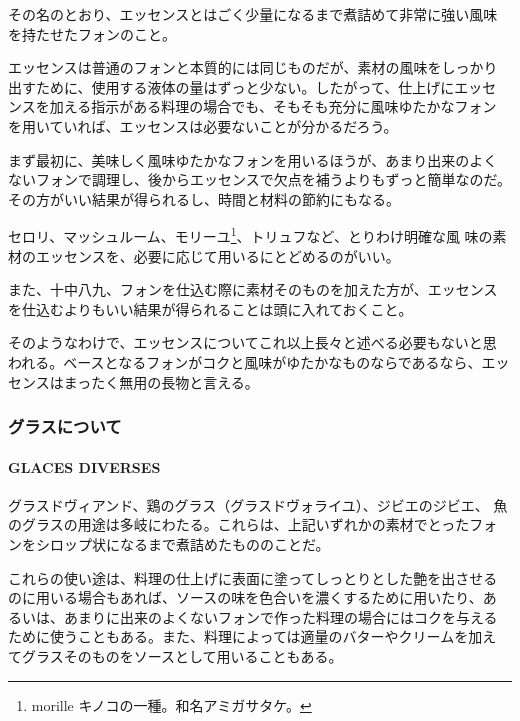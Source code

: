 \begin{recette}
その名のとおり、エッセンスとはごく少量になるまで煮詰めて非常に強い風味
を持たせたフォンのこと。

エッセンスは普通のフォンと本質的には同じものだが、素材の風味をしっかり
出すために、使用する液体の量はずっと少ない。したがって、仕上げにエッセ
ンスを加える指示がある料理の場合でも、そもそも充分に風味ゆたかなフォン
を用いていれば、エッセンスは必要ないことが分かるだろう。

まず最初に、美味しく風味ゆたかなフォンを用いるほうが、あまり出来のよく
ないフォンで調理し、後からエッセンスで欠点を補うよりもずっと簡単なのだ。
その方がいい結果が得られるし、時間と材料の節約にもなる。

セロリ、マッシュルーム、モリーユ\footnote{morille
  キノコの一種。和名アミガサタケ。}、トリュフなど、とりわけ明確な風
味の素材のエッセンスを、必要に応じて用いるにとどめるのがいい。

また、十中八九、フォンを仕込む際に素材そのものを加えた方が、エッセンス
を仕込むよりもいい結果が得られることは頭に入れておくこと。

そのようなわけで、エッセンスについてこれ以上長々と述べる必要もないと思
われる。ベースとなるフォンがコクと風味がゆたかなものならであるなら、エッ
センスはまったく無用の長物と言える。

\maeaki

\hypertarget{ux30b0ux30e9ux30b9ux306bux3064ux3044ux3066}{%
\subsubsection{グラスについて}\label{ux30b0ux30e9ux30b9ux306bux3064ux3044ux3066}}

\hypertarget{glaces-diverses}{%
\paragraph{GLACES DIVERSES}\label{glaces-diverses}}


グラスドヴィアンド、鶏のグラス（グラスドヴォライユ）、ジビエのジビエ、
魚のグラスの用途は多岐にわたる。これらは、上記いずれかの素材でとったフォ
ンをシロップ状になるまで煮詰めたもののことだ。

これらの使い途は、料理の仕上げに表面に塗ってしっとりとした艶を出させる
のに用いる場合もあれば、ソースの味を色合いを濃くするために用いたり、あ
るいは、あまりに出来のよくないフォンで作った料理の場合にはコクを与える
ために使うこともある。また、料理によっては適量のバターやクリームを加え
てグラスそのものをソースとして用いることもある。


\end{recette}
